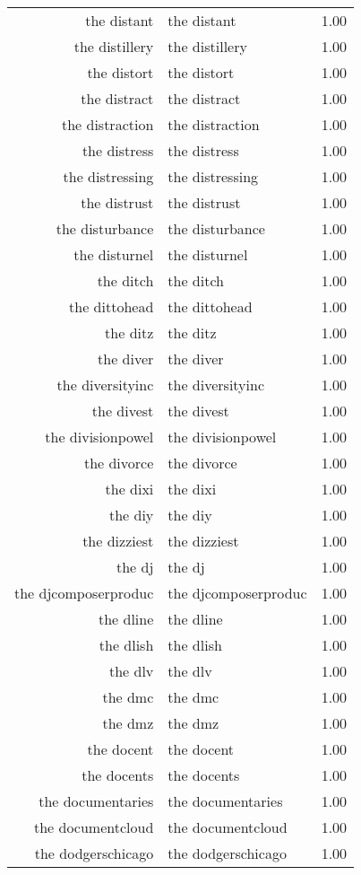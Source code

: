 \begin{table}[ht]
\begin{tabular}{rlr}
  the distant & the distant & 1.00 \\ 
  the distillery & the distillery & 1.00 \\ 
  the distort & the distort & 1.00 \\ 
  the distract & the distract & 1.00 \\ 
  the distraction & the distraction & 1.00 \\ 
  the distress & the distress & 1.00 \\ 
  the distressing & the distressing & 1.00 \\ 
  the distrust & the distrust & 1.00 \\ 
  the disturbance & the disturbance & 1.00 \\ 
  the disturnel & the disturnel & 1.00 \\ 
  the ditch & the ditch & 1.00 \\ 
  the dittohead & the dittohead & 1.00 \\ 
  the ditz & the ditz & 1.00 \\ 
  the diver & the diver & 1.00 \\ 
  the diversityinc & the diversityinc & 1.00 \\ 
  the divest & the divest & 1.00 \\ 
  the divisionpowel & the divisionpowel & 1.00 \\ 
  the divorce & the divorce & 1.00 \\ 
  the dixi & the dixi & 1.00 \\ 
  the diy & the diy & 1.00 \\ 
  the dizziest & the dizziest & 1.00 \\ 
  the dj & the dj & 1.00 \\ 
  the djcomposerproduc & the djcomposerproduc & 1.00 \\ 
  the dline & the dline & 1.00 \\ 
  the dlish & the dlish & 1.00 \\ 
  the dlv & the dlv & 1.00 \\ 
  the dmc & the dmc & 1.00 \\ 
  the dmz & the dmz & 1.00 \\ 
  the docent & the docent & 1.00 \\ 
  the docents & the docents & 1.00 \\ 
  the documentaries & the documentaries & 1.00 \\ 
  the documentcloud & the documentcloud & 1.00 \\ 
  the dodgerschicago & the dodgerschicago & 1.00 \\ 

\end{tabular}
\end{table}
